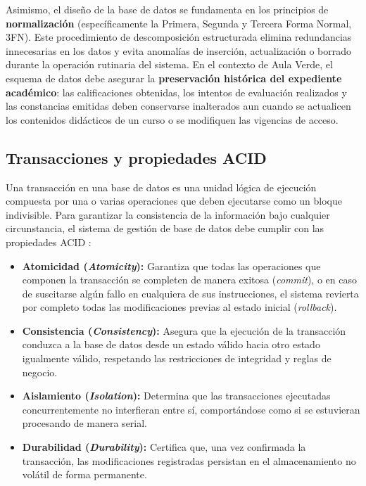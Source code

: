 Asimismo, el diseño de la base de datos se fundamenta en los principios de \textbf{normalización} (específicamente la Primera, Segunda y Tercera Forma Normal, 3FN). Este procedimiento de descomposición estructurada elimina redundancias innecesarias en los datos y evita anomalías de inserción, actualización o borrado durante la operación rutinaria del sistema. En el contexto de Aula Verde, el esquema de datos debe asegurar la \textbf{preservación histórica del expediente académico}: las calificaciones obtenidas, los intentos de evaluación realizados y las constancias emitidas deben conservarse inalterados aun cuando se actualicen los contenidos didácticos de un curso o se modifiquen las vigencias de acceso.

\subsection{Transacciones y propiedades ACID}

Una transacción en una base de datos es una unidad lógica de ejecución compuesta por una o varias operaciones que deben ejecutarse como un bloque indivisible. Para garantizar la consistencia de la información bajo cualquier circunstancia, el sistema de gestión de base de datos debe cumplir con las propiedades ACID \cite{elmasri2016fundamentals}:

\begin{itemize}
    \item \textbf{Atomicidad (\textit{Atomicity}):} Garantiza que todas las operaciones que componen la transacción se completen de manera exitosa (\textit{commit}), o en caso de suscitarse algún fallo en cualquiera de sus instrucciones, el sistema revierta por completo todas las modificaciones previas al estado inicial (\textit{rollback}).
    \item \textbf{Consistencia (\textit{Consistency}):} Asegura que la ejecución de la transacción conduzca a la base de datos desde un estado válido hacia otro estado igualmente válido, respetando las restricciones de integridad y reglas de negocio.
    \item \textbf{Aislamiento (\textit{Isolation}):} Determina que las transacciones ejecutadas concurrentemente no interfieran entre sí, comportándose como si se estuvieran procesando de manera serial.
    \item \textbf{Durabilidad (\textit{Durability}):} Certifica que, una vez confirmada la transacción, las modificaciones registradas persistan en el almacenamiento no volátil de forma permanente.
\end{itemize}

